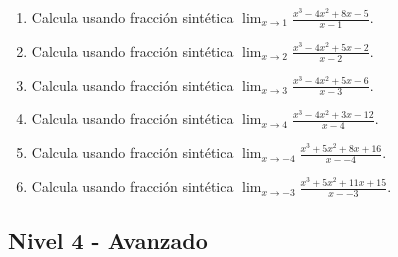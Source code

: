 \documentclass[11pt,a4paper]{article}
\begin{document}
\begin{enumerate}[label=\textbf{E\arabic*.},start=241]
\item Calcula usando fracción sintética $\displaystyle\lim_{x\to 1}\frac{x^3 - 4x^2 + 8x - 5}{x-1}$. 

\item Calcula usando fracción sintética $\displaystyle\lim_{x\to 2}\frac{x^3 - 4x^2 + 5x - 2}{x-2}$. 

\item Calcula usando fracción sintética $\displaystyle\lim_{x\to 3}\frac{x^3 - 4x^2 + 5x - 6}{x-3}$. 

\item Calcula usando fracción sintética $\displaystyle\lim_{x\to 4}\frac{x^3 - 4x^2 + 3x - 12}{x-4}$. 

\item Calcula usando fracción sintética $\displaystyle\lim_{x\to -4}\frac{x^3 + 5x^2 + 8x + 16}{x--4}$. 

\item Calcula usando fracción sintética $\displaystyle\lim_{x\to -3}\frac{x^3 + 5x^2 + 11x + 15}{x--3}$. 

\end{enumerate}

\subsection{Nivel 4 - Avanzado}
\end{document}

